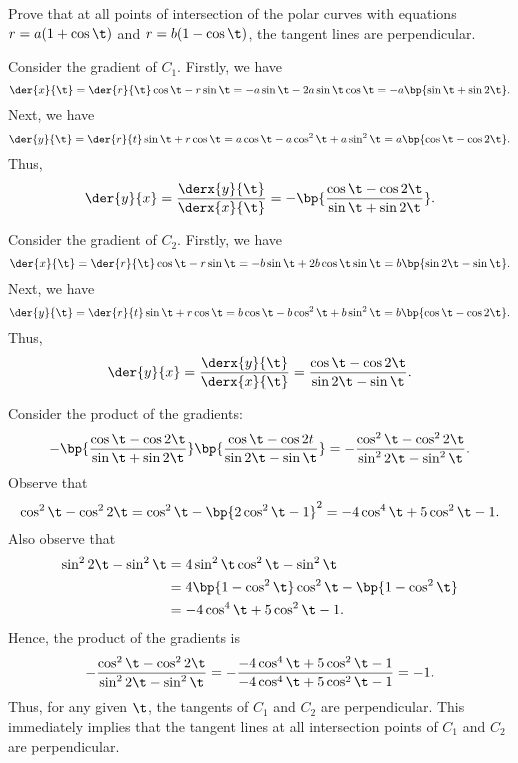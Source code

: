 \begin{problem}[\chili]
    Prove that at all points of intersection of the polar curves with equations $r = a(1 + \cos \t)$ and $r = b(1 - \cos\t)$, the tangent lines are perpendicular.
\end{problem}
\begin{solution}
    Consider the gradient of $C_1$. Firstly, we have \[\der{x}{\t} = \der{r}{\t} \cos \t - r\sin \t = -a\sin\t - 2a\sin\t\cos\t = -a\bp{\sin\t + \sin2\t}.\] Next, we have \[\der{y}{\t} = \der{r}{t} \sin \t + r \cos \t = a\cos \t - a \cos^2 \t + a \sin^2 \t = a\bp{\cos \t - \cos 2\t}.\] Thus, \[\der{y}{x} = \frac{\derx{y}{\t}}{\derx{x}{\t}} = -\bp{\frac{\cos \t - \cos 2\t}{\sin\t + \sin2\t}}.\]

    Consider the gradient of $C_2$. Firstly, we have \[\der{x}{\t} = \der{r}{\t} \cos \t - r\sin \t = -b \sin\t + 2b\cos \t \sin \t = b\bp{\sin 2\t - \sin \t}.\] Next, we have \[\der{y}{\t} = \der{r}{t} \sin \t + r \cos \t = b\cos \t - b \cos^2 \t + b \sin^2 \t = b\bp{\cos \t - \cos 2\t}.\] Thus, \[\der{y}{x} = \frac{\derx{y}{\t}}{\derx{x}{\t}} = \frac{\cos \t - \cos 2\t}{\sin 2\t - \sin \t}.\]

    Consider the product of the gradients: \[-\bp{\frac{\cos \t - \cos 2\t}{\sin\t + \sin2\t}}\bp{\frac{\cos \t - \cos 2t}{\sin 2\t - \sin \t}} = -\frac{\cos^2 \t - \cos^2 2\t}{\sin^2 2\t - \sin^2 \t}.\] Observe that \[\cos^2 \t - \cos^2 2\t = \cos^2 \t - \bp{2\cos^2 \t - 1}^2 = -4\cos^4 \t + 5\cos^2 \t - 1.\] Also observe that
    \begin{align*}
        \sin^2 2\t - \sin^2 \t &= 4\sin^2 \t \cos^2 \t - \sin^2 \t\\
        &= 4\bp{1 - \cos^2 \t} \cos^2 \t - \bp{1 - \cos^2 \t}\\
        &= -4\cos^4 \t + 5\cos^2 \t - 1.
    \end{align*}
    Hence, the product of the gradients is \[-\frac{\cos^2 \t - \cos^2 2\t}{\sin^2 2\t - \sin^2 \t} = -\frac{-4\cos^4 \t + 5\cos^2 \t - 1}{-4\cos^4 \t + 5\cos^2 \t - 1} = -1.\] Thus, for any given $\t$, the tangents of $C_1$ and $C_2$ are perpendicular. This immediately implies that the tangent lines at all intersection points of $C_1$ and $C_2$ are perpendicular.
\end{solution}